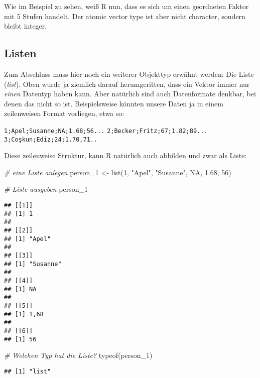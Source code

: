 \documentclass[
]{book}
\newenvironment{Shaded}{\begin{snugshade}}{\end{snugshade}}
\newcommand{\CommentTok}[1]{\textcolor[rgb]{0.56,0.35,0.01}{\textit{#1}}}
\newcommand{\ConstantTok}[1]{\textcolor[rgb]{0.00,0.00,0.00}{#1}}
\newcommand{\DecValTok}[1]{\textcolor[rgb]{0.00,0.00,0.81}{#1}}
\newcommand{\FloatTok}[1]{\textcolor[rgb]{0.00,0.00,0.81}{#1}}
\newcommand{\FunctionTok}[1]{\textcolor[rgb]{0.00,0.00,0.00}{#1}}
\newcommand{\NormalTok}[1]{#1}
\newcommand{\OtherTok}[1]{\textcolor[rgb]{0.56,0.35,0.01}{#1}}
\newcommand{\StringTok}[1]{\textcolor[rgb]{0.31,0.60,0.02}{#1}}
\begin{document}
Wie im Beispiel zu sehen, weiß R nun, dass es sich um einen geordneten Faktor mit 5 Stufen handelt. Der atomic vector type ist aber nicht character, sondern bleibt integer.

\hypertarget{listen}{%
\subsection{Listen}\label{listen}}

Zum Abschluss muss hier noch ein weiterer Objekttyp erwähnt werden: Die Liste (\emph{list}). Oben wurde ja ziemlich darauf herumgeritten, dass ein Vektor immer nur \emph{einen} Datentyp haben kann. Aber natürlich sind auch Datenformate denkbar, bei denen das nicht so ist. Beispielsweise könnten unsere Daten ja in einem zeilenweisen Format vorliegen, etwa so:

\texttt{1;Apel;Susanne;NA;1.68;56...}
\texttt{2;Becker;Fritz;67;1.82;89...}
\texttt{3;Coşkun;Ediz;24;1.70,71..}

Diese zeilenweise Struktur, kann R natürlich auch abbilden und zwar als Liste:

\begin{Shaded}
\begin{Highlighting}[]
\CommentTok{\# eine Liste anlegen}
\NormalTok{person\_1 }\OtherTok{\textless{}{-}} \FunctionTok{list}\NormalTok{(}\DecValTok{1}\NormalTok{, }\StringTok{"Apel"}\NormalTok{, }\StringTok{"Susanne"}\NormalTok{, }\ConstantTok{NA}\NormalTok{, }\FloatTok{1.68}\NormalTok{, }\DecValTok{56}\NormalTok{)}

\CommentTok{\# Liste ausgeben}
\NormalTok{person\_1}
\end{Highlighting}
\end{Shaded}

\begin{verbatim}
## [[1]]
## [1] 1
## 
## [[2]]
## [1] "Apel"
## 
## [[3]]
## [1] "Susanne"
## 
## [[4]]
## [1] NA
## 
## [[5]]
## [1] 1,68
## 
## [[6]]
## [1] 56
\end{verbatim}

\begin{Shaded}
\begin{Highlighting}[]
\CommentTok{\# Welchen Typ hat die Liste?}
\FunctionTok{typeof}\NormalTok{(person\_1)}
\end{Highlighting}
\end{Shaded}

\begin{verbatim}
## [1] "list"
\end{verbatim}
\end{document}
